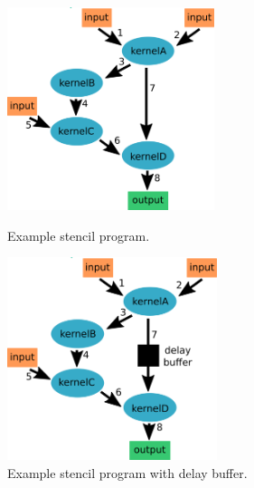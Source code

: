 \begin{figure}[h]
	\begin{minipage}{.5\columnwidth}
		\centering
		\includegraphics[height=16em]{drawings/model-delay-buffer1.png}
		\caption{Example stencil program.}
		\label{fig:model-delay-buffer}
		\vspace{1em}
	\end{minipage}
	\begin{minipage}{.5\columnwidth}
		\centering
		\includegraphics[height=16em]{drawings/model-delay-buffer2.png}
		\caption{Example stencil program with delay buffer.}
		\label{fig:model-delay-buffer2}
	\end{minipage}
\end{figure}



